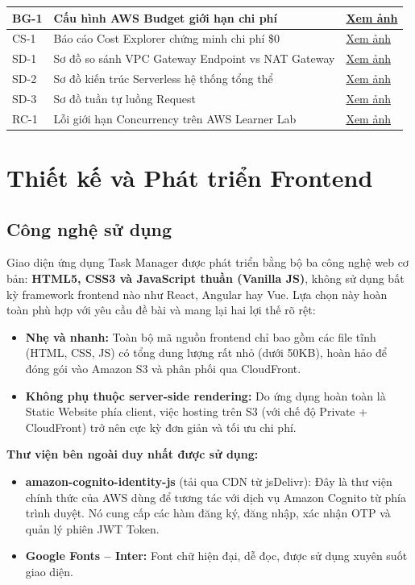 \documentclass[13pt]{article}
\begin{document}
\begin{longtable}{|p{}|p{}|p{}|}
BG-1 & Cấu hình AWS Budget giới hạn chi phí & \hyperref[img:BG-1]{Xem ảnh} \\ \hline
CS-1 & Báo cáo Cost Explorer chứng minh chi phí \$0 & \hyperref[img:CS-1]{Xem ảnh} \\ \hline
SD-1 & Sơ đồ so sánh VPC Gateway Endpoint vs NAT Gateway & \hyperref[img:SD-1]{Xem ảnh} \\ \hline
SD-2 & Sơ đồ kiến trúc Serverless hệ thống tổng thể & \hyperref[img:SD-2]{Xem ảnh} \\ \hline
SD-3 & Sơ đồ tuần tự luồng Request & \hyperref[img:SD-3]{Xem ảnh} \\ \hline
RC-1 & Lỗi giới hạn Concurrency trên AWS Learner Lab & \hyperref[img:RC-1]{Xem ảnh} \\ \hline
\end{longtable}
\newpage

\section{Thiết kế và Phát triển Frontend}

\subsection{Công nghệ sử dụng}
Giao diện ứng dụng Task Manager được phát triển bằng bộ ba công nghệ web cơ bản: \textbf{HTML5, CSS3 và JavaScript thuần (Vanilla JS)}, không sử dụng bất kỳ framework frontend nào như React, Angular hay Vue. Lựa chọn này hoàn toàn phù hợp với yêu cầu đề bài và mang lại hai lợi thế rõ rệt:

\begin{itemize}
    \item \textbf{Nhẹ và nhanh:} Toàn bộ mã nguồn frontend chỉ bao gồm các file tĩnh (HTML, CSS, JS) có tổng dung lượng rất nhỏ (dưới 50KB), hoàn hảo để đóng gói vào Amazon S3 và phân phối qua CloudFront.
    \item \textbf{Không phụ thuộc server-side rendering:} Do ứng dụng hoàn toàn là Static Website phía client, việc hosting trên S3 (với chế độ Private + CloudFront) trở nên cực kỳ đơn giản và tối ưu chi phí.
\end{itemize}

\textbf{Thư viện bên ngoài duy nhất được sử dụng:}
\begin{itemize}
    \item \textbf{amazon-cognito-identity-js} (tải qua CDN từ jsDelivr): Đây là thư viện chính thức của AWS dùng để tương tác với dịch vụ Amazon Cognito từ phía trình duyệt. Nó cung cấp các hàm đăng ký, đăng nhập, xác nhận OTP và quản lý phiên JWT Token.
    \item \textbf{Google Fonts -- Inter:} Font chữ hiện đại, dễ đọc, được sử dụng xuyên suốt giao diện.
\end{itemize}
\end{document}
